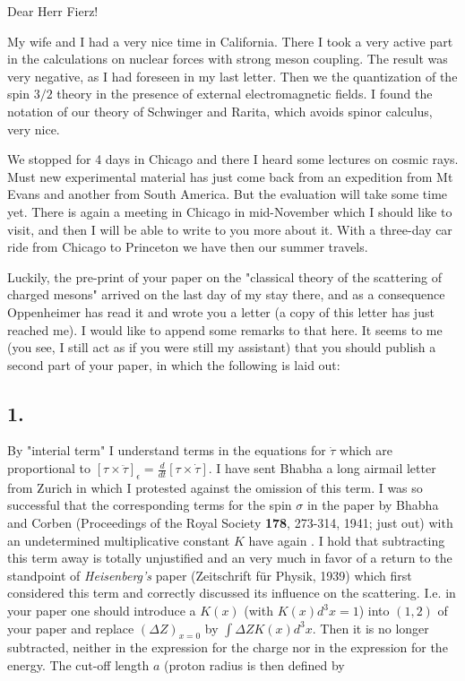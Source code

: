 \date{September 30, 1941}

Dear Herr Fierz!

My wife and I had a very nice time in California. There I took a very active part in the calculations on nuclear forces with strong meson coupling. The result was very negative, as I had foreseen in my last letter. Then we  the quantization of the spin $3/2$ theory in the presence of external electromagnetic fields. I found the notation of our theory of Schwinger and Rarita, which avoids spinor calculus, very nice.

We stopped for 4 days in Chicago and there I heard some lectures on cosmic rays. Must new experimental material has just come back from an expedition from Mt Evans and another from South America. But the evaluation will take some time yet. There is again a meeting in Chicago in mid-November which I should like to visit, and then I will be able to write to you more about it. With a three-day car ride from Chicago to Princeton we have then  our summer travels.

Luckily, the pre-print of your paper on the "classical theory of the scattering of charged mesons" arrived on the last day of my stay there, and as a consequence Oppenheimer has read it and wrote you a letter (a copy of this letter has just reached me). I would like to append some remarks to that here. It seems to me (you see, I still act as if you were still my assistant) that you should publish a second part of your paper, in which the following is laid out:

\subsection*{1. }

By "interial term" I understand terms in the equations for $\dot{\tau}$ which are proportional to $[\tau\times\ddot{\tau}]_\epsilon = \frac{d}{{dt}}[\tau\times\dot{\tau}]$. I have sent Bhabha a long airmail letter from Zurich in which I protested against the omission of this term. I was so successful that the corresponding terms for the spin $\sigma$ in the paper by Bhabha and Corben (Proceedings of the Royal Society \textbf{178}, 273-314, 1941; just out) with an undetermined multiplicative constant $K$ have again . I hold that subtracting this term away is totally unjustified and an very much in favor of a return to the standpoint of \textit{Heisenberg's} paper (Zeitschrift für Physik, 1939) which first considered this term and correctly discussed its influence on the scattering. I.e. in your paper one should introduce a  $K(x)$ (with $K(x){d^3x}=1$) into $(1, 2)$ of your paper and replace $(\Delta Z)_{x=0}$ by $\int\Delta ZK(x){d^3 x}$. Then it is no longer subtracted, neither in the expression for the charge nor in the expression for the energy. The cut-off length $a$ (proton radius
 is then defined by 

